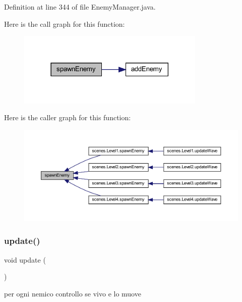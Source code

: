 Definition at line 344 of file Enemy\+Manager.\+java.

Here is the call graph for this function\+:\nopagebreak
\begin{figure}[H]
\begin{center}
\leavevmode
\includegraphics[width=254pt]{classmanagers_1_1_enemy_manager_a3714d243133c700dca12625cccf518aa_cgraph}
\end{center}
\end{figure}
Here is the caller graph for this function\+:\nopagebreak
\begin{figure}[H]
\begin{center}
\leavevmode
\includegraphics[width=350pt]{classmanagers_1_1_enemy_manager_a3714d243133c700dca12625cccf518aa_icgraph}
\end{center}
\end{figure}
\mbox{\label{classmanagers_1_1_enemy_manager_ac5c54df7ed3b930268c8d7752c101725}} 
\subsubsection{\texorpdfstring{update()}{update()}}
{\footnotesize\ttfamily void update (\begin{DoxyParamCaption}{ }\end{DoxyParamCaption})}



per ogni nemico controllo se vivo e lo muove 




